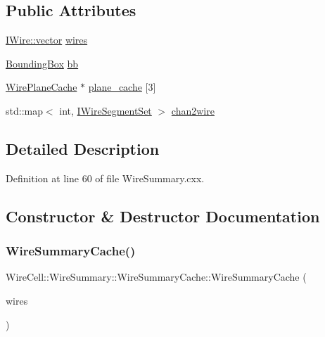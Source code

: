 \subsection*{Public Attributes}
\begin{DoxyCompactItemize}
\item 
\hyperlink{class_wire_cell_1_1_i_data_ae1a9f863380499bb43f39fabb6276660}{I\+Wire\+::vector} \hyperlink{struct_wire_summary_1_1_wire_summary_cache_a986cfc2dce7cd3843932bb49fdf3a976}{wires}
\item 
\hyperlink{class_wire_cell_1_1_bounding_box}{Bounding\+Box} \hyperlink{struct_wire_summary_1_1_wire_summary_cache_a6892eda9a2540392cf4e29a54596f702}{bb}
\item 
\hyperlink{struct_wire_plane_cache}{Wire\+Plane\+Cache} $\ast$ \hyperlink{struct_wire_summary_1_1_wire_summary_cache_a0daed7bc0a1a992880b46e9439fb8924}{plane\+\_\+cache} \mbox{[}3\mbox{]}
\item 
std\+::map$<$ int, \hyperlink{namespace_wire_cell_aff640c8ffcb5478403ad4bcede30c54b}{I\+Wire\+Segment\+Set} $>$ \hyperlink{struct_wire_summary_1_1_wire_summary_cache_a29ca052c786502edc469940797f3bdf6}{chan2wire}
\end{DoxyCompactItemize}


\subsection{Detailed Description}


Definition at line 60 of file Wire\+Summary.\+cxx.



\subsection{Constructor \& Destructor Documentation}
\mbox{\label{struct_wire_summary_1_1_wire_summary_cache_abab786675698a6a4add71eabf8f04b49}} 
\subsubsection{\texorpdfstring{Wire\+Summary\+Cache()}{WireSummaryCache()}}
{\footnotesize\ttfamily Wire\+Cell\+::\+Wire\+Summary\+::\+Wire\+Summary\+Cache\+::\+Wire\+Summary\+Cache (\begin{DoxyParamCaption}\item[{const \hyperlink{class_wire_cell_1_1_i_data_ae1a9f863380499bb43f39fabb6276660}{I\+Wire\+::vector} \&}]{wires }\end{DoxyParamCaption})\hspace{0.3cm}{\ttfamily [inline]}}



